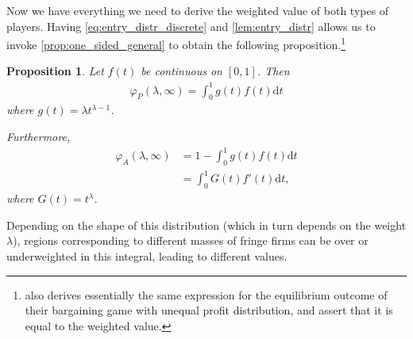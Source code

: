 \documentclass[a4paper]{article}
\newtheorem{proposition}{Proposition}
\newcommand{\dt}{\mathrm{d}t}
\begin{document}
Now we have everything we need to derive the weighted value of both types of players.
Having \cref{eq:entry_distr_discrete} and \cref{lem:entry_distr} allows us to invoke \cref{prop:one_sided_general} to obtain the following proposition.\footnote{
    \textcite{stole1996intra} also derives essentially the same expression for the equilibrium outcome of their bargaining game with unequal profit distribution, and assert that it is equal to the weighted value.
}

\begin{proposition}
    \label{prop:one_sided_weighted}
    Let $f(t)$ be continuous on $[0, 1]$. Then
    \begin{align*}
        \varphi_P(\lambda, \infty) = \int_0^1 g(t) f(t) \dt
    \end{align*}
    where $g(t) = \lambda t^{\lambda - 1}$.

    Furthermore,
    \begin{align*}
        \varphi_A(\lambda, \infty) &= 1 - \int_0^1 g(t) f(t) \dt \\
                                   &= \int_0^1 G(t) f'(t) \dt,
    \end{align*}
    where $G(t) = t^\lambda$.
\end{proposition}

Depending on the shape of this distribution (which in turn depends on the weight $\lambda$), regions corresponding to different masses of fringe firms can be over or underweighted in this integral, leading to different values.
\end{document}
